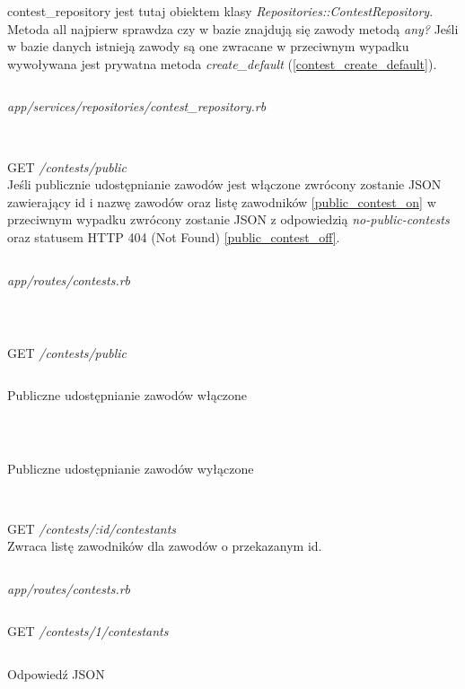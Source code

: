 \documentclass[11pt,a4paper, twoside]{article}
\begin{document}
\indent contest\_repository jest tutaj obiektem klasy \emph{Repositories::ContestRepository}. Metoda all najpierw sprawdza czy w bazie znajdują się zawody metodą \emph{any?} Jeśli w bazie danych istnieją zawody są one zwracane w przeciwnym wypadku wywoływana jest prywatna metoda \emph{create\_default} (\ref{contest_create_default}).
\begin{listing}
\inputminted{ruby}{./src/contest_create_default.rb}
\caption{\emph{app/services/repositories/contest\_repository.rb}}
$\label{contest_create_default}$
\end{listing}
\newpage
\noindent
GET \emph{/contests/public}
\\
\noindent
Jeśli publicznie udostępnianie zawodów jest włączone zwrócony zostanie JSON zawierający id i nazwę zawodów oraz listę zawodników \ref{public_contest_on} w przeciwnym wypadku zwrócony zostanie JSON z odpowiedzią \emph{no-public-contests} oraz statusem HTTP 404 (Not Found) \ref{public_contest_off}.
\begin{listing}
\inputminted{ruby}{./src/get_contest_public.rb}
\caption{\emph{app/routes/contests.rb}}
$\label{get_contest_public}$
\end{listing}
\begin{listing}
\inputminted{ruby}{./src/curl_public_contest}
\caption{GET \emph{/contests/public}}
\end{listing}
\newpage
\begin{listing}
\inputminted{json}{./src/curl_public_contest_on}
\caption{Publiczne udostępnianie zawodów włączone}
$\label{public_contest_on}$
\end{listing}
\begin{listing}
\inputminted{json}{./src/curl_public_contest_off}
\caption{Publiczne udostępnianie zawodów wyłączone}
$\label{public_contest_off}$
\end{listing}
\noindent
GET \emph{/contests/:id/contestants}
\\
\noindent
Zwraca listę zawodników dla zawodów o przekazanym id.
\begin{listing}
\inputminted{ruby}{./src/contest_contestants.rb}
\caption{\emph{app/routes/contests.rb}}
\end{listing}
\begin{listing}[H]
\inputminted{ruby}{./src/curl_contest_contestants}
\caption{GET \emph{/contests/1/contestants}}
\end{listing}
\begin{listing}[H]
\inputminted{json}{./src/curl_contest_contestants_response}
\caption{Odpowiedź JSON}
\end{listing}
\end{document}
